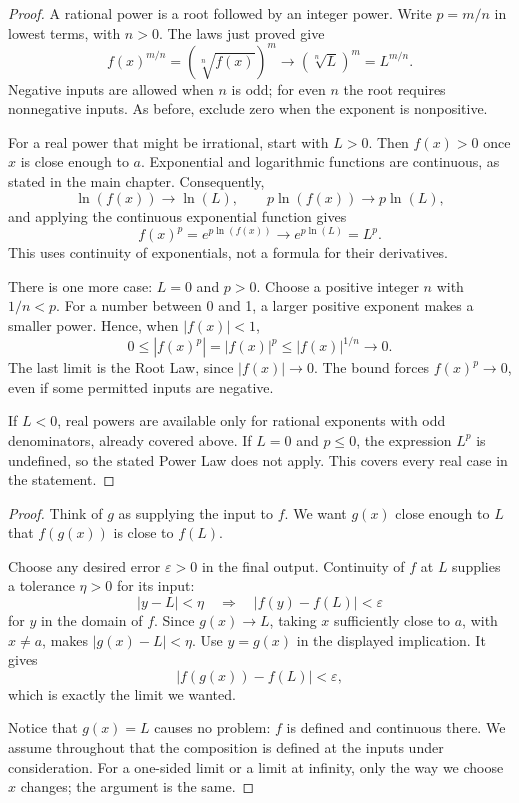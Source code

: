 \begin{proof}
A rational power is a root followed by an integer power. Write
$p=m/n$ in lowest terms, with $n>0$. The laws just proved give
$$f(x)^{m/n}=\left(\sqrt[n]{f(x)}\right)^m
\longrightarrow\left(\sqrt[n]{L}\right)^m=L^{m/n}.$$
Negative inputs are allowed when $n$ is odd; for even $n$ the root
requires nonnegative inputs. As before, exclude zero when the exponent
is nonpositive.

For a real power that might be irrational, start with $L>0$.
Then $f(x)>0$ once $x$ is close enough to $a$. Exponential and logarithmic
functions are continuous, as stated in the main chapter. Consequently,
$$\ln(f(x))\to\ln(L),\qquad
p\ln(f(x))\to p\ln(L),$$
and applying the continuous exponential function gives
$$f(x)^p=e^{p\ln(f(x))}\longrightarrow e^{p\ln(L)}=L^p.$$
This uses continuity of exponentials, not a formula for their derivatives.

There is one more case: $L=0$ and $p>0$. Choose a positive integer $n$
with $1/n<p$. For a number between 0 and 1, a larger positive exponent
makes a smaller power. Hence, when $|f(x)|<1$,
$$0\leq |f(x)^p|=|f(x)|^p\leq |f(x)|^{1/n}\longrightarrow0.$$
The last limit is the Root Law, since $|f(x)|\to0$.
The bound forces $f(x)^p\to0$, even if some permitted inputs are negative.

If $L<0$, real powers are available only for rational exponents with
odd denominators, already covered above. If $L=0$ and $p\leq0$, the
expression $L^p$ is undefined, so the stated Power Law does not apply.
This covers every real case in the statement.
\end{proof}


\begin{proof}
Think of $g$ as supplying the input to $f$. We want $g(x)$ close enough
to $L$ that $f(g(x))$ is close to $f(L)$.

Choose any desired error $\varepsilon>0$ in the final output.
Continuity of $f$ at $L$ supplies a tolerance $\eta>0$ for its input:
$$|y-L|<\eta\quad\Longrightarrow\quad |f(y)-f(L)|<\varepsilon$$
for $y$ in the domain of $f$. Since $g(x)\to L$, taking $x$ sufficiently
close to $a$, with $x\ne a$, makes $|g(x)-L|<\eta$.
Use $y=g(x)$ in the displayed implication. It gives
$$|f(g(x))-f(L)|<\varepsilon,$$
which is exactly the limit we wanted.

Notice that $g(x)=L$ causes no problem: $f$ is defined and continuous
there. We assume throughout that the composition is defined at the
inputs under consideration. For a one-sided limit or a limit at
infinity, only the way we choose $x$ changes; the argument is the same.
\end{proof}

